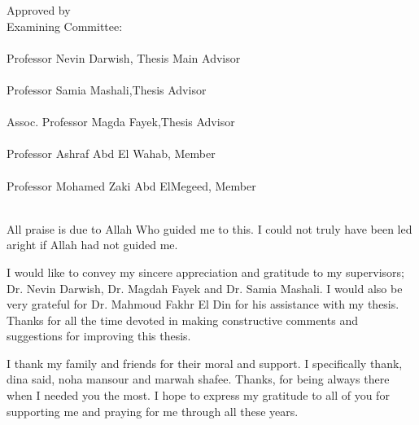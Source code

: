 \documentclass[11pt,doublespace]{Sketchthesis}
\begin{document}
    Approved by\\                                           
Examining Committee:\\
 \makebox[6in]{\hrulefill}\\ 
Professor Nevin Darwish, Thesis Main Advisor\\
 \makebox[6in]{\hrulefill}\\ 
Professor Samia Mashali,Thesis Advisor \\
 \makebox[6in]{\hrulefill}\\  
Assoc. Professor Magda Fayek,Thesis Advisor\\ 
 \makebox[6in]{\hrulefill}\\ 
Professor  Ashraf Abd El Wahab, Member\\
 \makebox[6in]{\hrulefill}\\ 
Professor Mohamed Zaki Abd ElMegeed, Member\\
 \makebox[6in]{\hrulefill}\\ 


\begin{acknowledgments}     
All praise is due to Allah Who guided me to this. I could not truly have been led aright if Allah had not guided me.

I would like to convey my sincere appreciation and gratitude to my supervisors; Dr. Nevin Darwish, Dr. Magdah Fayek and Dr. Samia Mashali. I would also be very grateful for Dr. Mahmoud Fakhr El Din for his assistance with my thesis. Thanks for all the time devoted in making constructive comments and suggestions for improving this thesis.

 I thank my family and friends for their moral and support. I specifically thank, dina said, noha mansour and marwah shafee. Thanks, for being always there when I needed you the most. I hope to express my gratitude to all of you for supporting me and praying for me through all these years.
 \end{acknowledgments}                                   %
\end{document}
